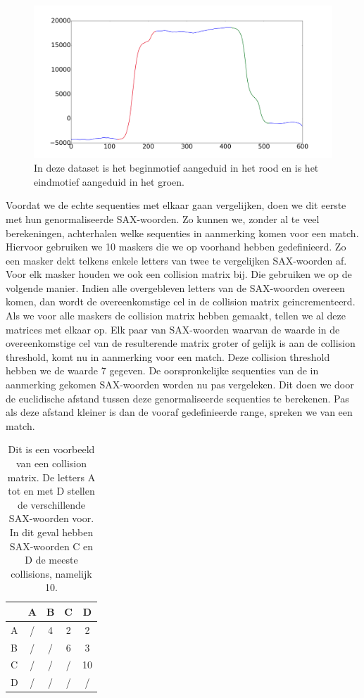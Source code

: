 \documentclass{article}
\begin{document}
\begin{figure}[h]
\centering
\includegraphics[width=\linewidth]{images/motif_begin_end}
\caption{In deze dataset is het beginmotief aangeduid in het rood en is het eindmotief aangeduid in het groen.}
\label{fig:beginend}
\end{figure}

Voordat we de echte sequenties met elkaar gaan vergelijken, doen we dit eerste met hun genormaliseerde SAX-woorden. Zo kunnen we, zonder al te veel berekeningen, achterhalen welke sequenties in aanmerking komen voor een match. Hiervoor gebruiken we 10 maskers die we op voorhand hebben gedefinieerd. Zo een masker dekt telkens enkele letters van twee te vergelijken SAX-woorden af. Voor elk masker houden we ook een collision matrix bij. Die gebruiken we op de volgende manier. Indien alle overgebleven letters van de SAX-woorden overeen komen, dan wordt de overeenkomstige cel in de collision matrix geincrementeerd. Als we voor alle maskers de collision matrix hebben gemaakt, tellen we al deze matrices met elkaar op. Elk paar van SAX-woorden waarvan de waarde in de overeenkomstige cel van de resulterende matrix groter of gelijk is aan de collision threshold, komt nu in aanmerking voor een match. Deze collision threshold hebben we de waarde 7 gegeven. De oorspronkelijke sequenties van de in aanmerking gekomen SAX-woorden worden nu pas vergeleken. Dit doen we door de euclidische afstand tussen deze genormaliseerde sequenties te berekenen. Pas als deze afstand kleiner is dan de vooraf gedefinieerde range, spreken we van een match.

\begin{table}
\caption{Dit is een voorbeeld van een collision matrix. De letters A tot en met D stellen de verschillende SAX-woorden voor. In dit geval hebben SAX-woorden C en D de meeste collisions, namelijk 10.}
\centering
\begin{tabular}{ l || c | c | c | c }
& A & B & C & D \\ \hline
\hline
A & / & 4 & 2 & 2 \\ \hline
B & / & / & 6 & 3 \\ \hline
C & / & / & / & 10\\ \hline
D & / & / & / & / \\
\hline
\end{tabular}\par
\end{table}
\end{document}
